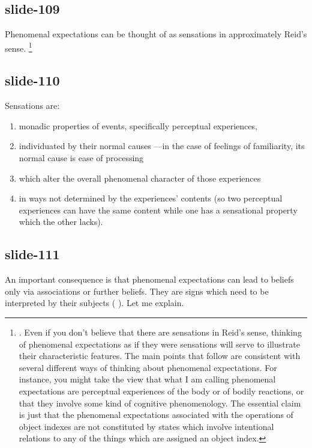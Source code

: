 \documentclass[12pt,\papersize]{extarticle}
\begin{document}
\subsection{slide-109}
Phenomenal expectations can be thought of as sensations in approximately
Reid’s sense.%
\footnote{
\citet{Reid:1785cj,Reid:1785nz}.
Even if you don’t believe that there are sensations in Reid’s sense,
thinking of phenomenal expectations as if they were sensations will
serve to illustrate their characteristic features.
The main points that follow are consistent with several different ways of
thinking about phenomenal expectations.
For instance, you might take the view that
what I am calling phenomenal expectations are
perceptual experiences of the body or of bodily reactions,
or that they involve some kind of cognitive phenomenology.
The essential claim is just that the phenomenal expectations associated with
the operations of object indexes are not constituted by states which involve
intentional relations to any of the things which are assigned an object index.
}

\subsection{slide-110}
Sensations are:
\begin{enumerate}
\item monadic properties of events, specifically perceptual experiences,
\item individuated by their normal causes%
---in the case of feelings of familiarity, its normal cause is ease of processing
\item which alter the overall phenomenal character of those experiences
\item in ways not determined by the experiences’ contents
(so two perceptual experiences can have the same content while one has a sensational property which the other lacks).
\end{enumerate}

\subsection{slide-111}
An important consequence is that phenomenal expectations can lead to beliefs
only via associations or further beliefs.
They are signs which need to be interpreted by their subjects
(\citealp[Essay~II, Chap.~16, p.~228]{Reid:1785cj}
\citealp[Chap.~VI sect.~III, pp.~164–5]{Reid:1785nz}).
Let me explain.
\end{document}
